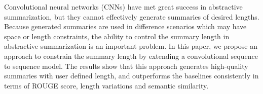 Convolutional neural networks (CNNs) have met great success in abstractive summarization, but they cannot effectively generate summaries of desired lengths. Because generated summaries are used in difference scenarios which may have space or length constraints, the ability to control the summary length in abstractive summarization is an important problem. In this paper, we propose an approach to constrain the summary length by extending a convolutional sequence to sequence model. The results show that this approach generates high-quality summaries with user defined length, and outperforms the baselines consistently in terms of ROUGE score, length variations and semantic similarity.
